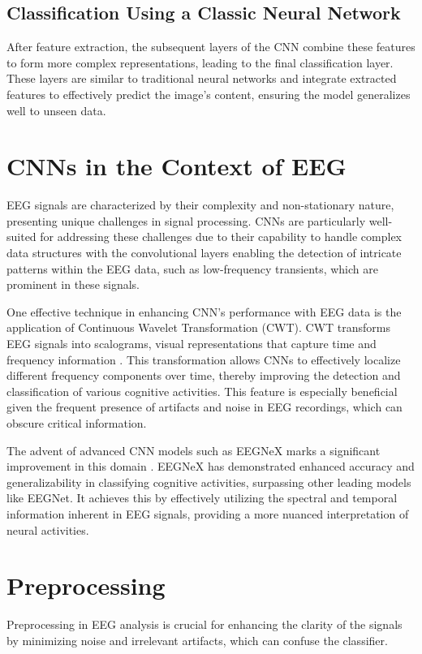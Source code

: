 \subsection{Classification Using a Classic Neural Network}
After feature extraction, the subsequent layers of the CNN combine these features to form more complex representations, leading to the final classification layer. These layers are similar to traditional neural networks and integrate extracted features to effectively predict the image's content, ensuring the model generalizes well to unseen data.



\section{CNNs in the Context of EEG}
EEG signals are characterized by their complexity and non-stationary nature, presenting unique challenges in signal processing. CNNs are particularly well-suited for addressing these challenges due to their capability to handle complex data structures with the convolutional layers enabling the detection of intricate patterns within the EEG data, such as low-frequency transients, which are prominent in these signals\cite{Chen2023}.

One effective technique in enhancing CNN's performance with EEG data is the application of Continuous Wavelet Transformation (CWT). CWT transforms EEG signals into scalograms, visual representations that capture time and frequency information \cite{Arts2022}. This transformation allows CNNs to effectively localize different frequency components over time, thereby improving the detection and classification of various cognitive activities. This feature is especially beneficial given the frequent presence of artifacts and noise in EEG recordings, which can obscure critical information.

The advent of advanced CNN models such as EEGNeX marks a significant improvement in this domain \cite{demir2022eegnext}. EEGNeX has demonstrated enhanced accuracy and generalizability in classifying cognitive activities, surpassing other leading models like EEGNet\cite{Lawhern_2018}. It achieves this by effectively utilizing the spectral and temporal information inherent in EEG signals, providing a more nuanced interpretation of neural activities.

\section{Preprocessing}
Preprocessing in EEG analysis is crucial for enhancing the clarity of the signals by minimizing noise and irrelevant artifacts, which can confuse the classifier.

